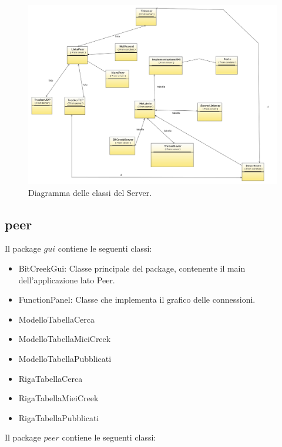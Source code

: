 \begin{figure}[h]
  \centerline{
    \mbox{\includegraphics[scale=0.35]{images/serverClass.jpg}}
  }
  \caption{Diagramma delle classi del Server.}
  \label{classiServer}
\end{figure}

\subsection{peer}

Il package $gui$ contiene le seguenti classi:

\begin{itemize}
\item BitCreekGui: Classe principale del package, contenente il main dell'applicazione lato Peer.
\item FunctionPanel: Classe che implementa il grafico delle connessioni.
\item ModelloTabellaCerca
\item ModelloTabellaMieiCreek
\item ModelloTabellaPubblicati
\item RigaTabellaCerca
\item RigaTabellaMieiCreek
\item RigaTabellaPubblicati
\end{itemize}

Il package $peer$ contiene le seguenti classi:

